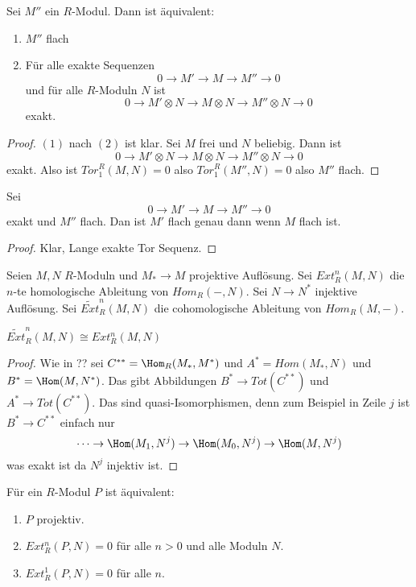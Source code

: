 \begin{Satz} Sei \(M''\) ein \(R\)-Modul. Dann ist äquivalent:
	\begin{enumerate}
		\item \(M''\) flach
		\item Für alle exakte Sequenzen \[0\to M'\to M\to M''\to 0\] und für alle \(R\)-Moduln \(N\) ist 
		\[0\to M'\otimes N\to M\otimes N\to M''\otimes N\to 0\] exakt.
	\end{enumerate}
	
\end{Satz}
\begin{proof}
	\((1)\) nach \((2)\) ist klar. Sei \(M\) frei und \(N\) beliebig.
	Dann ist \[0\to M'\otimes N\to M\otimes N\to M''\otimes N\to 0\] exakt.
	Also ist \(Tor_1^R(M,N)=0\) also \(Tor_1^R(M'',N)=0\) also \(M''\) flach.
\end{proof}
\begin{Satz} Sei \[0\to M'\to M\to M''\to 0\] exakt und \(M''\) flach.
	Dan ist \(M'\) flach genau dann wenn \(M\) flach ist.
	
\end{Satz}
\begin{proof}
	Klar, Lange exakte Tor Sequenz.
\end{proof}
\begin{Def} Seien \(M,N\) \(R\)-Moduln und \(M_*\to M\) projektive Auflösung.
	Sei \(Ext_R^n(M,N)\) die \(n\)-te homologische Ableitung von \(Hom_R(-,N)\). 
	Sei  \(N\to N^*\) injektive Auflösung. Sei \(\tilde{Ext}_R^n(M,N)\) die cohomologische Ableitung von \(Hom_R(M,-)\). 
	
\end{Def}
\begin{Satz} \(\tilde{Ext}_R^n(M,N)\cong Ext_R^n(M,N)\)
	
\end{Satz}
\begin{proof}
	Wie in ?? sei \(C^{**}=\Hom_R(M_*,M^*)\) und \(A^*=Hom(M_*,N)\) und \(B^*=\Hom(M,N^*)\).
	Das gibt Abbildungen \(B^*\to Tot(C^{**})\) und \(A^*\to Tot(C^{**})\). Das sind quasi-Isomorphismen, denn zum
	Beispiel in Zeile \(j\) ist \(B^*\to C^{**}\) einfach nur 
	\[\dots\to\Hom(M_1,N^j)\to\Hom(M_0,N^j)\to\Hom(M,N^j)\] was exakt ist da \(N^j\) injektiv ist.
\end{proof}
\begin{Satz} Für ein \(R\)-Modul \(P\) ist äquivalent:
	\begin{enumerate}
		\item \(P\) projektiv.
		\item \(Ext_R^n(P,N)=0\) für alle \(n>0\) und alle Moduln \(N\).
		\item \(Ext_R^1(P,N)=0\) für alle \(n\).
	\end{enumerate}
	
\end{Satz}
